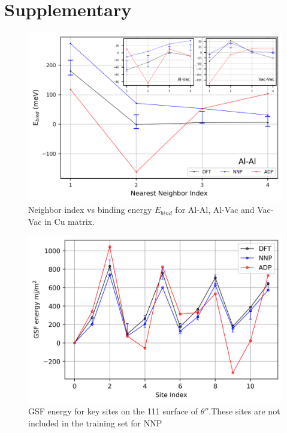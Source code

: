 \documentclass{article}
\begin{document}
\newpage
  

\newpage
\appendix
\section{Supplementary}
\begin{figure}[H]%
\centering%
\includegraphics[width=1.2\textwidth,center]{./figures/solsol_in_cu.png}%
\caption{Neighbor index vs binding energy $E_{bind}$ for Al-Al, Al-Vac and Vac-Vac in Cu matrix.}%
\label{fig:solsol_in_cu}
\end{figure}


\begin{figure}[H]%
\centering%
\includegraphics[width=540px]{./figures/NOTINOQMD_00002-GSF_111.png}%
\caption{GSF energy for key sites on the 111 surface of  $\theta''$.These sites are not included in the  training set for NNP}%
\end{figure}
\end{document}
